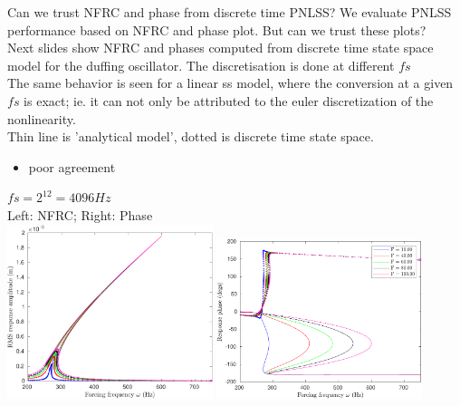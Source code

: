 \documentclass[9pt]{beamer}
\begin{document}
\begin{frame}{Can we trust NFRC and phase from discrete time PNLSS?}
  We evaluate PNLSS performance based on NFRC and phase plot. But can we trust
  these plots?\\
  Next slides show NFRC and phases computed from discrete time state space model
  for the duffing oscillator. The discretisation is done at different $fs$\\
  The same behavior is seen for a linear ss model, where the conversion at a
  given $fs$ is exact; ie. it can not only be attributed to the euler
  discretization of the nonlinearity.\\
  Thin line is 'analytical model', dotted is discrete time state space.
  \begin{itemize}
  \item poor agreement
  \end{itemize}
  \begin{center}
    $fs=2^{12}=4096 Hz$\\
    Left: NFRC; Right: Phase\\
    \includegraphics[width=0.45\textwidth]{fig/nfrc/dssex_frf_Amp_fs4096}
    \includegraphics[width=0.45\textwidth]{fig/nfrc/dssex_frf_Phase_fs4096}
  \end{center}
\end{frame}
\end{document}
